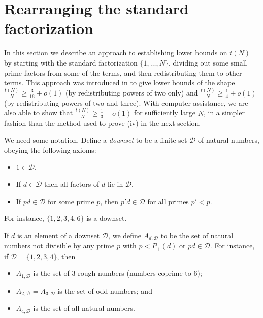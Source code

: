 \documentclass[12pt,a4paper,reqno]{amsart}
\numberwithin{equation}{section}
\theoremstyle{plain}
\theoremstyle{definition}
\begin{document}
\section{Rearranging the standard factorization}\label{rearrange-sec}

In this section we describe an approach to establishing lower bounds on $t(N)$ by starting with the standard factorization $\{1,\dots,N\}$, dividing out some small prime factors from some of the terms, and then redistributing them to other terms.  This approach was introduced in \cite{guy} to give lower bounds of the shape $\frac{t(N)}{N} \geq \frac{3}{16} + o(1)$ (by redistributing powers of two only) and $\frac{t(N)}{N} \geq \frac{1}{4} + o(1)$ (by redistributing powers of two and three).  With computer assistance, we are also able to show that $\frac{t(N)}{N} \geq \frac{1}{3}+o(1)$ for sufficiently large $N$, in a simpler fashion than the method used to prove (iv) in the next section.

We need some notation.  Define a \emph{downset} to be a finite set ${\mathcal D}$ of natural numbers, obeying the following axioms:
\begin{itemize}
  \item $1 \in {\mathcal D}$.
  \item If $d \in {\mathcal D}$ then all factors of $d$ lie in ${\mathcal D}$.
  \item If $pd \in {\mathcal D}$ for some prime $p$, then $p'd \in {\mathcal D}$ for all primes $p'<p$.
\end{itemize}
For instance, $\{1,2,3,4,6\}$ is a downset.  

If $d$ is an element of a downset ${\mathcal D}$, we define $A_{d,\mathcal{D}}$ to be the set of natural numbers not divisible by any prime $p$ with $p < P_+(d)$ or $pd \in \mathcal{D}$.  For instance, if ${\mathcal D} = \{1,2,3,4\}$, then
\begin{itemize}
\item $A_{1,{\mathcal D}}$ is the set of $3$-rough numbers (numbers coprime to $6$);
\item $A_{2,{\mathcal D}} = A_{3,{\mathcal D}}$ is the set of odd numbers; and
\item $A_{4,{\mathcal D}}$ is the set of all natural numbers.
\end{itemize}
\end{document}
